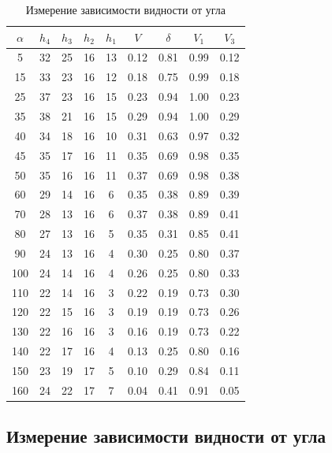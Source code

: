 \documentclass[a4paper,12pt]{article} %
\begin{document}
\begin{table}[H]
	\caption{Измерение зависимости видности от угла}
	\begin{center}
		\begin{tabular}{|c|c|c|c|c|c|c|c|c|}
			\hline
			$ 	\alpha  $ & $ h_4 $ &  $ h_3 $& $ h_2 $ & $ h_1 $ & $ V $ & $  \delta  $ & $ V_1 $ & $ V_3 $ \\
			\hline
			5   & 32 & 25 & 16 & 13 & 0.12 & 0.81 & 0.99 & 0.12 \\
			15  & 33 & 23 & 16 & 12 & 0.18 & 0.75 & 0.99 & 0.18 \\
			25  & 37 & 23 & 16 & 15 & 0.23 & 0.94 & 1.00 & 0.23 \\
			35  & 38 & 21 & 16 & 15 & 0.29 & 0.94 & 1.00 & 0.29 \\
			40  & 34 & 18 & 16 & 10 & 0.31 & 0.63 & 0.97 & 0.32 \\
			45  & 35 & 17 & 16 & 11 & 0.35 & 0.69 & 0.98 & 0.35 \\
			50  & 35 & 16 & 16 & 11 & 0.37 & 0.69 & 0.98 & 0.38 \\
			60  & 29 & 14 & 16 & 6  & 0.35 & 0.38 & 0.89 & 0.39 \\
			70  & 28 & 13 & 16 & 6  & 0.37 & 0.38 & 0.89 & 0.41 \\
			80  & 27 & 13 & 16 & 5  & 0.35 & 0.31 & 0.85 & 0.41 \\
			90  & 24 & 13 & 16 & 4  & 0.30 & 0.25 & 0.80 & 0.37 \\
			100 & 24 & 14 & 16 & 4  & 0.26 & 0.25 & 0.80 & 0.33 \\
			110 & 22 & 14 & 16 & 3  & 0.22 & 0.19 & 0.73 & 0.30 \\
			120 & 22 & 15 & 16 & 3  & 0.19 & 0.19 & 0.73 & 0.26 \\
			130 & 22 & 16 & 16 & 3  & 0.16 & 0.19 & 0.73 & 0.22 \\
			140 & 22 & 17 & 16 & 4  & 0.13 & 0.25 & 0.80 & 0.16 \\
			150 & 23 & 19 & 17 & 5  & 0.10 & 0.29 & 0.84 & 0.11 \\
			160 & 24 & 22 & 17 & 7  & 0.04 & 0.41 & 0.91 & 0.05 \\
			\hline
		\end{tabular}
	\end{center}
	\label{table_v3}
\end{table}

\subsection{Измерение зависимости видности от угла}
\end{document}
